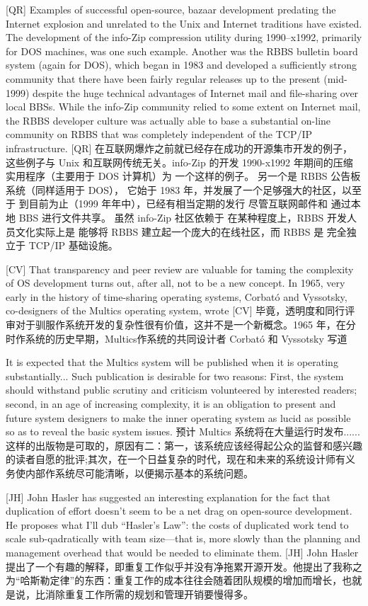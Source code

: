 \documentclass[a4paper,12pt,UTF8,twoside]{ctexbook}
\begin{document}
[QR] Examples of successful open-source, bazaar development predating the Internet explosion and unrelated to the Unix and Internet traditions have existed. The development of the info-Zip compression utility during 1990–x1992, primarily for DOS machines, was one such example. Another was the RBBS bulletin board system (again for DOS), which began in 1983 and developed a sufficiently strong community that there have been fairly regular releases up to the present (mid-1999) despite the huge technical advantages of Internet mail and file-sharing over local BBSs. While the info-Zip community relied to some extent on Internet mail, the RBBS developer culture was actually able to base a substantial on-line community on RBBS that was completely independent of the TCP/IP infrastructure.
[QR] 在互联网爆炸之前就已经存在成功的开源集市开发的例子，这些例子与 Unix 和互联网传统无关。info-Zip 的开发 1990-x1992 年期间的压缩实用程序（主要用于 DOS 计算机）为 一个这样的例子。 另一个是 RBBS 公告板系统（同样适用于 DOS）， 它始于 1983 年，并发展了一个足够强大的社区，以至于 到目前为止（1999 年年中），已经有相当定期的发行 尽管互联网邮件和 通过本地 BBS 进行文件共享。 虽然 info-Zip 社区依赖于 在某种程度上，RBBS 开发人员文化实际上是 能够将 RBBS 建立起一个庞大的在线社区，而 RBBS 是 完全独立于 TCP/IP 基础设施。

[CV] That transparency and peer review are valuable for taming the complexity of OS development turns out, after all, not to be a new concept. In 1965, very early in the history of time-sharing operating systems, Corbató and Vyssotsky, co-designers of the Multics operating system, wrote
[CV] 毕竟，透明度和同行评审对于驯服作系统开发的复杂性很有价值，这并不是一个新概念。1965 年，在分时作系统的历史早期，Multics作系统的共同设计者 Corbató 和 Vyssotsky 写道

It is expected that the Multics system will be published when it is operating substantially... Such publication is desirable for two reasons: First, the system should withstand public scrutiny and criticism volunteered by interested readers; second, in an age of increasing complexity, it is an obligation to present and future system designers to make the inner operating system as lucid as possible so as to reveal the basic system issues.
预计 Multics 系统将在大量运行时发布......这样的出版物是可取的，原因有二：第一，该系统应该经得起公众的监督和感兴趣的读者自愿的批评;其次，在一个日益复杂的时代，现在和未来的系统设计师有义务使内部作系统尽可能清晰，以便揭示基本的系统问题。

[JH] John Hasler has suggested an interesting explanation for the fact that duplication of effort doesn't seem to be a net drag on open-source development. He proposes what I'll dub ``Hasler's Law'': the costs of duplicated work tend to scale sub-qadratically with team size—that is, more slowly than the planning and management overhead that would be needed to eliminate them.
[JH] John Hasler 提出了一个有趣的解释，即重复工作似乎并没有净拖累开源开发。他提出了我称之为“哈斯勒定律”的东西：重复工作的成本往往会随着团队规模的增加而增长，也就是说，比消除重复工作所需的规划和管理开销要慢得多。
\end{document}
